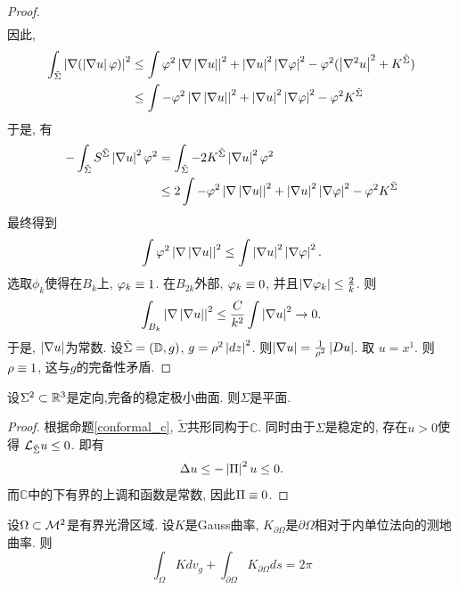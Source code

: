 \begin{proof}
\begin{align}
    \end{align}
    因此, 
    \begin{equation}
        \begin{split}
            \int_{\tilde{\Sigma}} \left | {\nabla} (\left | {\nabla} u \right |\varphi) \right |^2  & \le \int \varphi^2\left | {\nabla} \left | {\nabla} u \right | \right |^2 + \left | {\nabla} u \right |^2\left | {\nabla} \varphi \right |^2 -\varphi^2(\left | {\nabla}^2 u \right |^2 + K^{\tilde{\Sigma}}) \\
            &\le \int -\varphi^2\left | {\nabla} \left | {\nabla} u \right | \right |^2 + \left | {\nabla} u \right |^2\left | {\nabla} \varphi \right |^2 -\varphi^2K^{\tilde{\Sigma}}\\
        \end{split}
    \end{equation}
    于是, 有
    \begin{equation}
        \begin{split}
            -\int_{\tilde{\Sigma}} S^{\tilde{\Sigma}} \left | \nabla u \right |^2\varphi^2 &= \int_{\tilde{\Sigma}} -2K^{\tilde{\Sigma}}\left | \nabla u \right |^2\varphi^2 \\
            &\le 2\int -\varphi^2\left | {\nabla} \left | {\nabla} u \right | \right |^2 + \left | {\nabla} u \right |^2\left | {\nabla} \varphi \right |^2 -\varphi^2K^{\tilde{\Sigma}}
        \end{split}
    \end{equation}
    最终得到
    \begin{equation}
        \int \varphi^2 \left | \nabla \left | \nabla u \right | \right |^2 \le \int \left | \nabla u \right |^2 \left | \nabla \varphi \right |^2.
    \end{equation}
    选取$\phi_k$使得在$B_k$上, $\varphi_k \equiv 1$. 在$B_{2k}$外部, $\varphi_k \equiv 0$, 并且$\left | \nabla \varphi_k \right | \le \frac{2}{k}$. 则
    \begin{equation}
        \int_{B_k} \left | \nabla \left | \nabla u \right | \right |^2 \le \frac{C}{k^2}\int \left | \nabla u \right |^2 \to 0.
    \end{equation}
    于是, $\left | \nabla u \right |$为常数. 设${\tilde{\Sigma}}=(\mathbb{D}, g)$, $g=\rho^2 \left | dz \right |^2$. 则$\left | \nabla u \right |=\frac{1}{\rho^2} \left | Du \right |$. 取 $u=x^1$. 则$\rho \equiv 1$, 这与$g$的完备性矛盾.
\end{proof}
\begin{theorem}
    设$\Sigma^2 \subset \mathbb{R}^3$是定向,完备的稳定极小曲面. 则$\Sigma$是平面.
\end{theorem}
\begin{proof}
    根据命题\eqref{conformal_c}, $\tilde{\Sigma}$共形同构于$\mathbb{C}$. 同时由于$\Sigma$是稳定的, 存在$u>0$使得 $\mathcal{L}_{\tilde{\Sigma}} u \le 0$. 即有
    \begin{equation}
        \Delta u \le - \left | {\Pi} \right |^2 u \le 0.
    \end{equation}
    而$\mathbb{C}$中的下有界的上调和函数是常数, 因此${\Pi} \equiv 0$.
\end{proof}
\begin{theorem}
    设$\Omega \subset {\mathcal{M}}^2$是有界光滑区域. 设$K$是Gauss曲率, $K_{\partial \Omega}$是$\partial \Omega$相对于内单位法向的测地曲率. 则
    \begin{equation}
        \int_{\Omega} K dv_g +\int_{\partial \Omega} K_{\partial \Omega} ds=2 \pi
    \end{equation}
\end{theorem}
